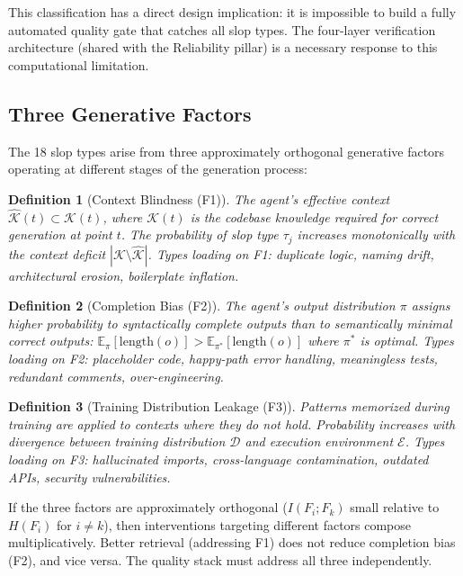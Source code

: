 \documentclass[11pt, a4paper, logo, copyright]{googledeepmind}
\newtheorem{definition}{Definition}[section]
\begin{document}
This classification has a direct design implication: it is impossible to build a fully automated quality gate that catches all slop types. The four-layer verification architecture (shared with the Reliability pillar) is a necessary response to this computational limitation.

\subsection{Three Generative Factors}

The 18 slop types arise from three approximately orthogonal generative factors operating at different stages of the generation process:

\begin{definition}[Context Blindness (F1)]
The agent's effective context $\hat{\mathcal{K}}(t) \subset \mathcal{K}(t)$, where $\mathcal{K}(t)$ is the codebase knowledge required for correct generation at point $t$. The probability of slop type $\tau_j$ increases monotonically with the context deficit $|\mathcal{K} \setminus \hat{\mathcal{K}}|$. Types loading on F1: duplicate logic, naming drift, architectural erosion, boilerplate inflation.
\end{definition}

\begin{definition}[Completion Bias (F2)]
The agent's output distribution $\pi$ assigns higher probability to syntactically complete outputs than to semantically minimal correct outputs: $\mathbb{E}_\pi[\mathrm{length}(o)] > \mathbb{E}_{\pi^*}[\mathrm{length}(o)]$ where $\pi^*$ is optimal. Types loading on F2: placeholder code, happy-path error handling, meaningless tests, redundant comments, over-engineering.
\end{definition}

\begin{definition}[Training Distribution Leakage (F3)]
Patterns memorized during training are applied to contexts where they do not hold. Probability increases with divergence between training distribution $\mathcal{D}$ and execution environment $\mathcal{E}$. Types loading on F3: hallucinated imports, cross-language contamination, outdated APIs, security vulnerabilities.
\end{definition}

If the three factors are approximately orthogonal ($I(F_i; F_k)$ small relative to $H(F_i)$ for $i \neq k$), then interventions targeting different factors compose multiplicatively. Better retrieval (addressing F1) does not reduce completion bias (F2), and vice versa. The quality stack must address all three independently.
\end{document}
